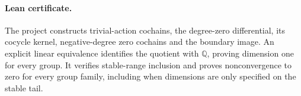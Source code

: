\documentclass[11pt]{article}
\begin{document}
\paragraph{Lean certificate.}
The project constructs trivial-action cochains, the degree-zero
differential, its cocycle kernel, negative-degree zero cochains and the
boundary image. An explicit linear equivalence identifies the quotient
with $\mathbb Q$, proving dimension one for every group. It verifies
stable-range inclusion and proves nonconvergence to zero for every group
family, including when dimensions are only specified on the stable tail.
\end{document}
